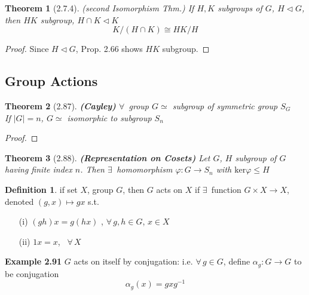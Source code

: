 \documentclass[twoside,landscape]{amsart}
\theoremstyle{plain}
\newtheorem{theorem}{Theorem}
\theoremstyle{definition}
\newtheorem{definition}{Definition}
\theoremstyle{remark}
\begin{document}
\begin{multicols*}{2}
\begin{theorem}[2.7.4] (second Isomorphism Thm.)
If $H,K$ subgroups of $G$, $H \lhd G$, \\
\quad then $HK$ subgroup, $H \cap K \lhd K$
\[
K/(H \cap K) \cong HK/ H
\]
\end{theorem}

\begin{proof} Since $H \lhd G$, Prop. 2.66 shows $HK$ subgroup. 










\end{proof}





\subsection{Group Actions}

\begin{theorem}[2.87] \textbf{(Cayley)} $\forall \, $ group $G \simeq $ subgroup of symmetric group $S_G$ \\
If $|G| = n$, $G \simeq $ isomorphic to subgroup $S_n$ 
\end{theorem}

\begin{proof}

\end{proof}

\begin{theorem}[2.88] \textbf{(Representation on Cosets)} Let $G$, $H$ subgroup of $G$ having finite index $n$.  Then $\exists \, $ homomorphism $\varphi:G \to S_n$ with $\text{ker}{\varphi} \leq H$
\end{theorem}


\begin{definition} if set $X$, group $G$, then $G$ acts on $X$ if $\exists \, $ function $G\times X \to X$, denoted $(g,x) \mapsto gx$ s.t. 
\begin{enumerate}
\item[(i)] $(gh)x = g(hx)$ , $\forall \, g, h \in G$, $x\in X$
\item[(ii)] $1x = x$, \, $\forall \, X$
\end{enumerate}
\end{definition}

\textbf{Example 2.91} $G$ acts on itself by conjugation: i.e. $\forall \, g\in G$, define $\alpha_g : G \to G$ to be conjugation
\[
\alpha_g(x) = gxg^{-1}
\]




\end{multicols*}
\end{document}

